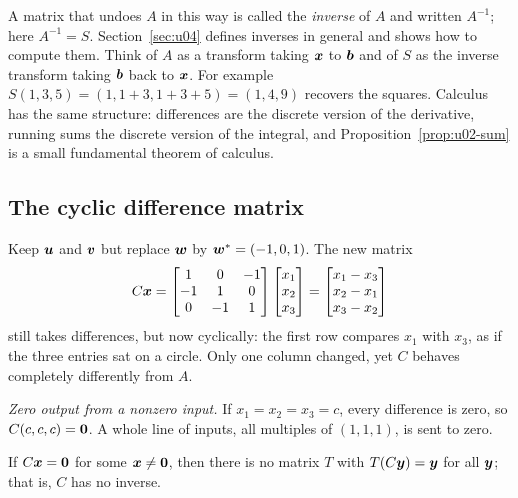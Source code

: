 A matrix that undoes $A$ in this way is called the \emph{inverse} of $A$ and written
$A^{-1}$; here $A^{-1}=S$. Section~\ref{sec:u04} defines inverses in general and shows how to
compute them. Think of $A$ as a transform taking $\boldsymbol{x}$ to $\boldsymbol{b}$ and of $S$ as the
inverse transform taking $\boldsymbol{b}$ back to $\boldsymbol{x}$. For example $S(1,3,5)=(1,1+3,1+3+5)=(1,4,9)$
recovers the squares. Calculus has the same structure: differences are the discrete version of
the derivative, running sums the discrete version of the integral, and
Proposition~\ref{prop:u02-sum} is a small fundamental theorem of calculus.

\subsection{The cyclic difference matrix}

Keep $\boldsymbol{u}$ and $\boldsymbol{v}$ but replace $\boldsymbol{w}$ by $\boldsymbol{w}^{*}=(-1,0,1)$. The new matrix
\begin{equation}\label{eq:u02-C}
  C\boldsymbol{x}=\begin{bmatrix} 1 & 0 & -1\\ -1 & 1 & 0\\ 0 & -1 & 1\end{bmatrix}
  \begin{bmatrix} x_1\\ x_2\\ x_3\end{bmatrix}
  =\begin{bmatrix} x_1-x_3\\ x_2-x_1\\ x_3-x_2\end{bmatrix}
\end{equation}
still takes differences, but now cyclically: the first row compares $x_1$ with $x_3$, as if
the three entries sat on a circle. Only one column changed, yet $C$ behaves completely
differently from $A$.

\emph{Zero output from a nonzero input.} If $x_1=x_2=x_3=c$, every difference is zero, so
$C(c,c,c)=\boldsymbol{0}$. A whole line of inputs, all multiples of $(1,1,1)$, is sent to zero.

\begin{proposition}\label{prop:u02-noinverse}
If $C\boldsymbol{x}=\boldsymbol{0}$ for some $\boldsymbol{x}\neq\boldsymbol{0}$, then there is no matrix $T$ with
$T(C\boldsymbol{y})=\boldsymbol{y}$ for all $\boldsymbol{y}$; that is, $C$ has no inverse.
\end{proposition}


